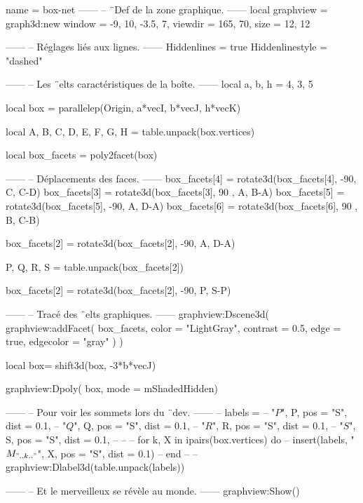 \documentclass{standalone}
\begin{document}
\begin{luadraw}{name = box-net}
------
-- ¨Def de la zone graphique.
------
local graphview = graph3d:new{
  window  = {-9, 10, -3.5, 7},
  viewdir = {165, 70},
  size    = {12, 12}
}

------
-- Réglages liés aux lignes.
------
Hiddenlines     = true
Hiddenlinestyle = "dashed"

------
-- Les ¨elts caractéristiques de la boîte.
------
local a, b, h = 4, 3, 5

local box = parallelep(Origin, a*vecI, b*vecJ, h*vecK)

local A, B, C, D, E, F, G, H = table.unpack(box.vertices)

local box_facets = poly2facet(box) 

------
-- Déplacements des faces.
------
box_facets[4] = rotate3d(box_facets[4], -90, {C, C-D})
box_facets[3] = rotate3d(box_facets[3], 90 , {A, B-A})
box_facets[5] = rotate3d(box_facets[5], -90, {A, D-A})
box_facets[6] = rotate3d(box_facets[6], 90 , {B, C-B})

box_facets[2] = rotate3d(box_facets[2], -90, {A, D-A})

P, Q, R, S = table.unpack(box_facets[2])

box_facets[2] = rotate3d(box_facets[2], -90, {P, S-P})

------
-- Tracé des ¨elts graphiques.
------
graphview:Dscene3d(
  graphview:addFacet(
    box_facets,
    {
      color     = "LightGray",
      contrast  = 0.5,
      edge      = true,
      edgecolor = "gray"
    })
)

local box= shift3d(box, -3*b*vecJ)

graphview:Dpoly(
    box,
    {mode = mShadedHidden})

------
-- Pour voir les sommets lors du ¨dev.
------
-- labels = {
--   "$P$", P, {pos = "S", dist = 0.1},
--   "$Q$", Q, {pos = "S", dist = 0.1},
--   "$R$", R, {pos = "S", dist = 0.1},
--   "$S$", S, {pos = "S", dist = 0.1},
-- }
--
-- for k, X in ipairs(box.vertices) do
--   insert(labels, {"$M_{".. k .."}$", X, {pos = "S", dist = 0.1}})
-- end
--
-- graphview:Dlabel3d(table.unpack(labels))

------
-- Et le merveilleux se révèle au monde.
------
graphview:Show()
\end{luadraw}
\end{document}

